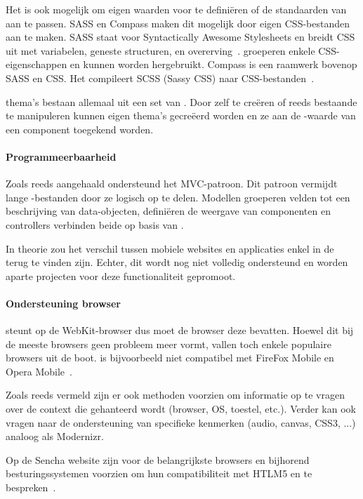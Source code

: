Het is ook mogelijk om eigen waarden voor  te definiëren of de standaarden van \st{} aan te passen.  
SASS en Compass maken dit mogelijk door eigen CSS-bestanden aan te maken.  
SASS staat voor Syntactically Awesome Stylesheets en breidt CSS uit met variabelen,  geneste structuren,  en overerving~\cite{Eppstein2013}.  
 groeperen enkele CSS-eigenschappen en kunnen worden hergebruikt.  
Compass is een raamwerk bovenop SASS en CSS.  
Het compileert SCSS (Sassy CSS) naar CSS-bestanden~\cite{Eppstein2013a}.        

\st{} thema's bestaan allemaal uit een set van .  
Door zelf  te creëren of reeds bestaande te manipuleren kunnen eigen thema's gecreëerd worden en ze aan de -waarde van een component toegekend worden.

\paragraph{Programmeerbaarheid}
\label{sec:sencha-programeerbaarheid}
Zoals reeds aangehaald ondersteund \st{} het MVC-patroon.  
Dit patroon vermijdt lange \js{}-bestanden door ze logisch op te delen.  
Modellen groeperen velden tot een beschrijving van data-objecten,  definiëren de weergave van componenten en controllers verbinden beide op basis van .

In theorie zou het verschil tussen mobiele websites en applicaties enkel in de  terug te vinden zijn.  
Echter,  dit wordt nog niet volledig ondersteund en worden aparte projecten voor deze functionaliteit gepromoot.

\paragraph{Ondersteuning browser}
\st{} steunt op de WebKit-browser  dus moet de browser deze bevatten.  
Hoewel dit bij de meeste browsers geen probleem meer vormt, vallen toch enkele populaire browsers uit de boot.  
\st{} is bijvoorbeeld niet compatibel met FireFox Mobile en Opera Mobile~\cite{JohnEClark2012}.

Zoals reeds vermeld zijn er ook methoden voorzien om informatie op te vragen over de context die gehanteerd wordt (browser, OS, toestel, etc.).  
Verder kan \st{} ook vragen naar de ondersteuning van specifieke kenmerken (audio,  canvas,  CSS3, ...)  analoog als Modernizr.  

Op de Sencha website zijn voor de belangrijkste browsers en bijhorend besturingssystemen  voorzien om hun compatibiliteit met HTLM5 en \st{} te bespreken~\cite{Inc.}.

